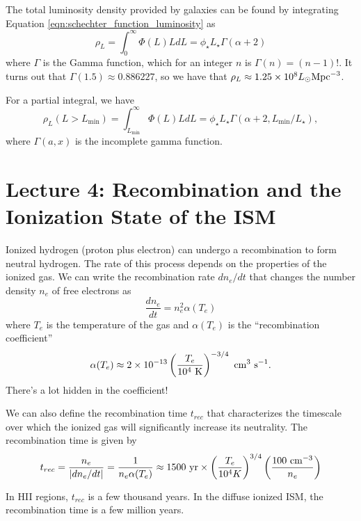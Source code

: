 \documentclass[]{article}
\begin{document}
The total luminosity density provided by galaxies can be found by integrating 
Equation \ref{eqn:schechter_function_luminosity} as
\begin{equation}
\rho_{L} = \int_{0}^{\infty} \Phi(L) L dL = \phi_\star L_{\star} \Gamma(\alpha + 2)
\end{equation}
\noindent
where $\Gamma$ is the Gamma function, which for an integer $n$ is $\Gamma(n) = (n-1)!$.
It turns out that $\Gamma(1.5)\approx0.886227$, so we have that 
$\rho_{L}\approx1.25\times10^{8}L_{\odot}\mathrm{Mpc}^{-3}$.

For a partial integral, we have
\begin{equation}
\rho_{L}(L>L_{\mathrm{min}}) = \int_{L_{\mathrm{min}}}^{\infty} \Phi(L) L dL = \phi_\star L_{\star} \Gamma(\alpha + 2, L_{\mathrm{min}}/L_{\star}),
\end{equation}
\noindent
where $\Gamma(a,x)$ is the incomplete gamma function.

\section{Lecture 4: Recombination and the Ionization State of the ISM}

Ionized hydrogen (proton plus electron) can undergo a recombination
to form neutral hydrogen. The rate of this process depends on the
properties of the ionized gas.  We can write the recombination rate
$dn_e/dt$ that changes the number density $n_e$ of free electrons as
\begin{equation}
\frac{d n_{e}}{d t} = n_{e}^2 \alpha(T_e)
\end{equation}
\noindent
where $T_e$ is the temperature of the gas and $\alpha(T_e)$ is 
the ``recombination coefficient''
\begin{equation}
\alpha(T_e) \approx 2 \times 10^{-13} \left( \frac{T_e}{10^4~\mathrm{K}}\right)^{-3/4}~\mathrm{cm}^{3}~\mathrm{s}^{-1}.
\end{equation}
\noindent
There's a lot hidden in the coefficient!

We can also define the recombination time $t_{rec}$ that characterizes
the timescale over which the ionized gas will significantly increase
its neutrality.  The recombination time is given by
\begin{equation}
t_{rec} = \frac{n_e}{|dn_e/dt|} = \frac{1}{n_e \alpha(T_e)} \approx 1500~\mathrm{yr} \times \left(\frac{T_e}{10^{4}K}\right)^{3/4}\left(\frac{100~\mathrm{cm}^{-3}}{n_e}\right)
\end{equation}

In HII regions, $t_{rec}$ is a few thousand years.  In the diffuse ionized ISM, the recombination time is a few million years.
\end{document}
